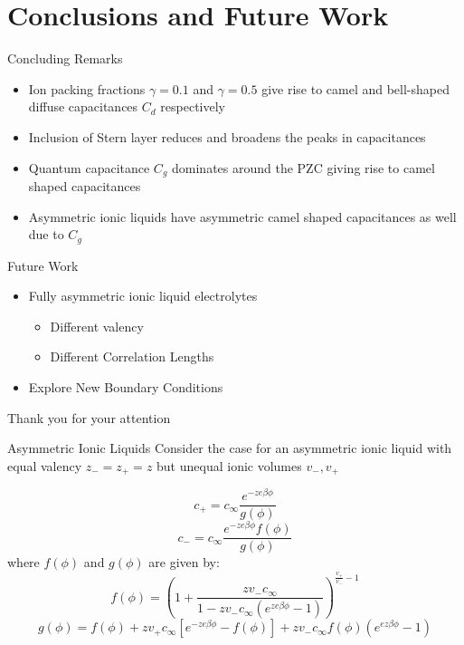 \documentclass{beamer}
\begin{document}
\section{Conclusions and Future Work}
\begin{frame}{Concluding Remarks}
\begin{itemize}
    \item Ion packing fractions $\gamma = 0.1$ and $\gamma = 0.5$ give rise to camel and bell-shaped diffuse capacitances $C_d$ respectively
    \item Inclusion of Stern layer reduces and broadens the peaks in capacitances
    \item Quantum capacitance $C_g$ dominates around the PZC giving rise to camel shaped capacitances
    \item Asymmetric ionic liquids have asymmetric camel shaped capacitances as well due to $C_g$
\end{itemize}{}
\end{frame}{}

\begin{frame}{Future Work}
\begin{itemize}
    \item Fully asymmetric ionic liquid electrolytes
    \begin{itemize}
        \item Different valency
        \item Different Correlation Lengths
    \end{itemize}{}
    \item Explore New Boundary Conditions
\end{itemize}{}
\end{frame}{}

\begin{frame}{}
    \begin{center}
    Thank you for your attention
    \end{center}
\end{frame}{}

\begin{frame}{Asymmetric Ionic Liquids}
    Consider the case for an asymmetric ionic liquid with equal valency $z_- = z_+ = z$ but unequal ionic volumes $v_-,v_+$
    
    $$c_+ = c_{\infty}\frac{e^{-ze\beta \phi}}{g(\phi)}$$
    $$c_- = c_{\infty}\frac{e^{-ze\beta \phi} f(\phi)}{g(\phi)}$$
    where $f(\phi)$ and $g(\phi)$ are given by:
    $$f(\phi) = (1 + \frac{zv_-c_{\infty}}{1 -zv_-c_{\infty}(e^{ze\beta\phi}-1)})^{\frac{v_+}{v_-} -1 } $$
    $$g(\phi) = f(\phi) + zv_+c_{\infty}[e^{-ze\beta\phi}-f(\phi)] +zv_-c_{\infty}f(\phi)(e^{ez\beta\phi} -1)   $$
\end{frame}
\end{document}
